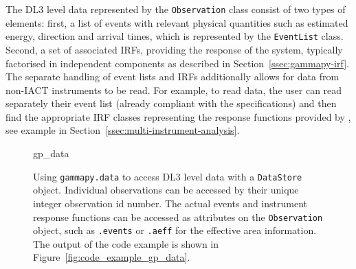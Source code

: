 \documentclass[longauth]{aa}
\newcommand{\code}[1]{\texttt{#1}}
\begin{document}
The DL3 level data represented by the \code{Observation} class consist
of two types of elements: first, a list of \gammaray events with relevant physical
quantities such as estimated energy, direction and arrival
times, which is represented by the \code{EventList} class. Second, a set of
associated IRFs, providing the response of the system, typically
factorised in independent components as described in
Section~\ref{ssec:gammapy-irf}. The separate handling of event lists and IRFs
additionally allows for data from non-IACT \gammaray instruments to be read. For
example, to read \fermi data, the user can read separately their event list
(already compliant with the \gadf specifications) and then find the appropriate
IRF classes representing the response functions provided by \fermi, see
example in Section~\ref{ssec:multi-instrument-analysis}.

\begin{figure}
	\small
	{gp_data}
	\caption{
        Using \code{gammapy.data} to access DL3 level data with a \code{DataStore} object.
        Individual observations can be accessed by their unique integer observation id number.
        The actual events and instrument response functions can be accessed
        as attributes on the \code{Observation} object, such as \code{.events}
        or \code{.aeff} for the effective area information. The output
		of the code example is shown in Figure~\ref{fig:code_example_gp_data}.
    }
	\label{fig*:minted:gp_data}
\end{figure}
%
\end{document}
